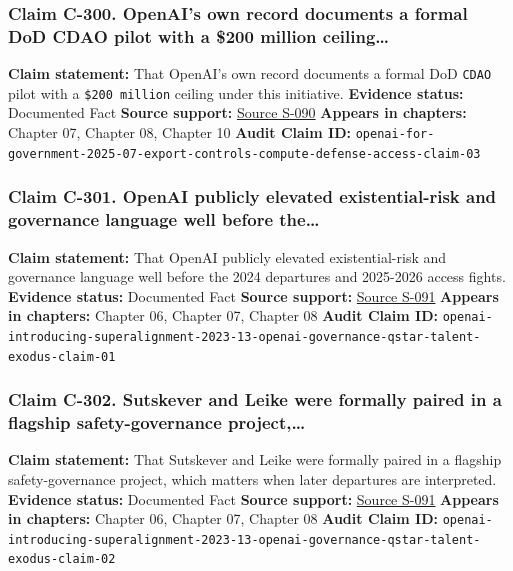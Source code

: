 \documentclass[
  american,
  11pt,
  letterpaper,
]{article}
\begin{document}
\subsubsection{Claim C-300. OpenAI's own record documents a formal DoD
CDAO pilot with a \$200 million
ceiling\ldots{}}\label{claim-c-300-openai-s-own-record-documents-a-formal-dod-cdao-pilot-with-a-200-million-ceiling}

\textbf{Claim statement:} That OpenAI's own record documents a formal
DoD \texttt{CDAO} pilot with a \texttt{\$200\ million} ceiling under
this initiative. \textbf{Evidence status:} Documented Fact
\textbf{Source support:}
\hyperref[source-s-090-introducing-openai-for-government]{Source S-090}
\textbf{Appears in chapters:} Chapter 07, Chapter 08, Chapter 10
\textbf{Audit Claim ID:}
\texttt{openai-for-government-2025-07-export-controls-compute-defense-access-claim-03}

\subsubsection{Claim C-301. OpenAI publicly elevated existential-risk
and governance language well before
the\ldots{}}\label{claim-c-301-openai-publicly-elevated-existential-risk-and-governance-language-well-before-the}

\textbf{Claim statement:} That OpenAI publicly elevated existential-risk
and governance language well before the 2024 departures and 2025-2026
access fights. \textbf{Evidence status:} Documented Fact \textbf{Source
support:} \hyperref[source-s-091-introducing-superalignment]{Source
S-091} \textbf{Appears in chapters:} Chapter 06, Chapter 07, Chapter 08
\textbf{Audit Claim ID:}
\texttt{openai-introducing-superalignment-2023-13-openai-governance-qstar-talent-exodus-claim-01}

\subsubsection{Claim C-302. Sutskever and Leike were formally paired in
a flagship safety-governance
project,\ldots{}}\label{claim-c-302-sutskever-and-leike-were-formally-paired-in-a-flagship-safety-governance-project}

\textbf{Claim statement:} That Sutskever and Leike were formally paired
in a flagship safety-governance project, which matters when later
departures are interpreted. \textbf{Evidence status:} Documented Fact
\textbf{Source support:}
\hyperref[source-s-091-introducing-superalignment]{Source S-091}
\textbf{Appears in chapters:} Chapter 06, Chapter 07, Chapter 08
\textbf{Audit Claim ID:}
\texttt{openai-introducing-superalignment-2023-13-openai-governance-qstar-talent-exodus-claim-02}
\end{document}
